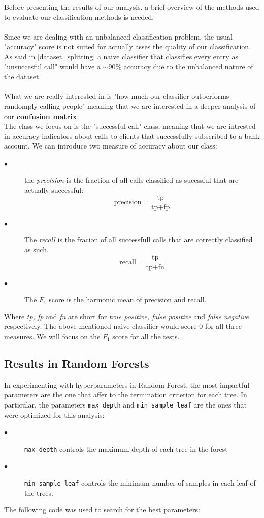 Before presenting the results of our analysis, a brief overview of the methods used to evaluate our classification methods is needed. \\
\\
Since we are dealing with an unbalanced classification problem, the usual "accuracy" score is not suited for actually asses the quality of our classification. As said in \ref{dataset_splitting} a naive classifier that classifies every entry as "unsuccesful call" would have a \(\sim 90\%\) accuracy due to the unbalanced nature of the dataset.\\
\\
What we are really interested in is "how much our classifier outperforms randomply calling people" meaning that we are interested in a deeper analysis of our \textbf{confusion matrix}.
\\
The class we focus on is the "successful call" class, meaning that we are intrested in accuracy indicators about calls to clients that successfully subscribed to a bank account. We can introduce two measure of accuracy about our class:
\begin{description}
    \item [\(\bullet\)] the \textit{precision} is the fraction of all calls classified as succssful that are actually successful: \begin{equation}
        \text{precision} = \frac{\text{tp}}{\text{tp}+\text{fp}}
    \end{equation}
    \item[\(\bullet\)] The \textit{recall} is the fracion of all successfull calls that are correctly classified as such. \begin{equation*}
        \text{recall} = \frac{\text{tp}}{\text{tp} + \text{fn}}
    \end{equation*} 
    \item[\(\bullet\)] The \(F_1\) score is the harmonic mean of precision and recall.
\end{description}
Where \textit{tp, fp} and \textit{fn} are short for \textit{true positive, false positive} and \textit{false negative} respectively.
The above mentioned naive classifier would score \(0\) for all three measures. We will focus on the \(F_1\) score for all the tests.
\subsection{Results in Random Forests}
In experimenting with hyperparameters in Random Forest, the most impactful parameters are the one that affer to the termination criterion for each tree. In particular, the parameters \texttt{max\_depth} and \texttt{min\_sample\_leaf} are the ones that were optimized for this analysis:
\begin{description}
    \item[\(\bullet\)] \texttt{max\_depth} controls the maximum depth of each tree in the forest \\
    \item[\(\bullet\)] \texttt{min\_sample\_leaf} controls the minimum number of samples in each leaf of the trees.
\end{description}
The following code was used to search for the best parameters:

